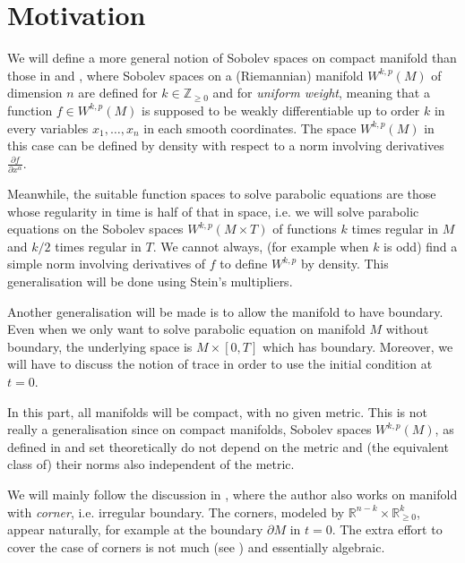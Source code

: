 \section{Motivation}
\label{sec:orgc3441c8}

We will define a more general notion of Sobolev spaces on compact manifold than those in
\cite{aubin_nonlinear_1998} and \cite{jost_riemannian_2008}, where Sobolev spaces on a
(Riemannian) manifold \(W^{k,p}(M)\) of dimension \(n\) are defined for
\(k\in \mathbb{Z}_{\geq 0}\) and for \emph{uniform weight}, meaning that a function \(f\in W^{k,p}(M)\) is supposed to be weakly differentiable up to order \(k\) in every variables \(x_1,\dots, x_n\) in each smooth coordinates. The space \(W^{k,p}(M)\) in this case can
be defined by density with respect to a norm involving derivatives \(\frac{\partial f}{\partial x^\alpha}\).

Meanwhile, the suitable function spaces to
solve parabolic equations are those whose regularity in time is half of that in space,
i.e. we will solve parabolic equations on the Sobolev spaces \(W^{k,p}(M\times T)\) of functions
\(k\) times regular in \(M\) and \(k/2\) times regular in \(T\). We cannot always,
(for example when \(k\) is odd) find a simple norm involving derivatives of \(f\) 
to define \(W^{k,p}\) by density. This generalisation will be done using Stein's
multipliers.

Another generalisation will be made is to allow the manifold to have boundary. Even when
we only want to solve parabolic equation on manifold \(M\) without boundary, the
underlying space is \(M\times [0, T]\) which has boundary. Moreover, we will have to
discuss the notion of trace in order to use the initial condition at \(t=0\). 

In this part, all manifolds will be compact, with no given metric. This is not really a
generalisation since on compact manifolds, Sobolev spaces \(W^{k,p}(M)\), as defined in
\cite{aubin_nonlinear_1998} and \cite{jost_riemannian_2008} set theoretically do not depend on
the metric and (the equivalent class of) their norms also independent of the metric.

We will mainly follow the discussion in \cite{hamilton_harmonic_1975}, where the author also
works on manifold with \emph{corner}, i.e. irregular boundary. The corners, modeled by \(\mathbb{R}^{n-k}\times \mathbb{R}_{\geq 0}^k\), appear naturally,
for example at the boundary \(\partial M\) in \(t=0\). The extra effort to cover the
case of corners is not much (see \cite[page 50]{hamilton_harmonic_1975}) and essentially algebraic.

